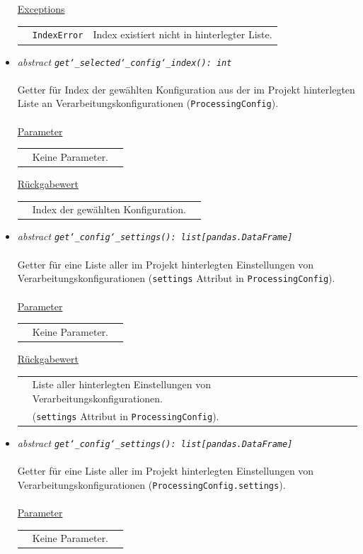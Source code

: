 \documentclass{article}
\begin{document}
\begin{itemize}
\underline{Exceptions}\\
\begin{tabular}{lll}
 & \texttt{IndexError} & Index existiert nicht in hinterlegter Liste.\\
\end{tabular}


\item \textit{\flqq{}abstract\frqq} \texttt{\textit{get\char`_selected\char`_config\char`_index(): int}}\\\\
Getter für Index der gewählten Konfiguration aus der im Projekt hinterlegten Liste an Verarbeitungskonfigurationen (\texttt{ProcessingConfig}).
\\\\
\underline{Parameter}\\
\begin{tabular}{lll}
 & Keine Parameter.
\end{tabular}

\underline{Rückgabewert}\\
\begin{tabular}{lll}
 & Index der gewählten Konfiguration.\\
\end{tabular}


\item \textit{\flqq{}abstract\frqq} \texttt{\textit{get\char`_config\char`_settings(): list[pandas.DataFrame]}}\\\\
Getter für eine Liste aller im Projekt hinterlegten Einstellungen von Verarbeitungskonfigurationen (\texttt{settings} Attribut in \texttt{ProcessingConfig}).
\\\\
\underline{Parameter}\\
\begin{tabular}{lll}
 & Keine Parameter.
\end{tabular}

\underline{Rückgabewert}\\
\begin{tabular}{lll}
 & Liste aller hinterlegten Einstellungen von Verarbeitungskonfigurationen.\\
 & (\texttt{settings} Attribut in \texttt{ProcessingConfig}).\\
\end{tabular}


\item \textit{\flqq{}abstract\frqq} \texttt{\textit{get\char`_config\char`_settings(): list[pandas.DataFrame]}}\\\\
Getter für eine Liste aller im Projekt hinterlegten Einstellungen von Verarbeitungskonfigurationen (\texttt{ProcessingConfig.settings}).
\\\\
\underline{Parameter}\\
\begin{tabular}{lll}
 & Keine Parameter.
\end{tabular}


\end{itemize}
\end{document}
